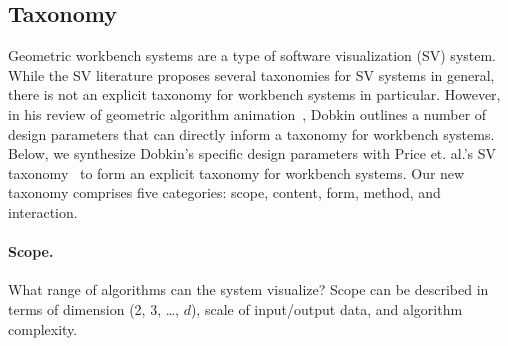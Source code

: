 \subsection{Taxonomy} 



Geometric workbench systems are a type of software visualization (SV) system.
While the SV literature proposes several taxonomies for SV systems in general,
there is not an explicit taxonomy for workbench systems in particular. However,
in his review of geometric algorithm animation~\cite{hausner1999animation},
Dobkin outlines a number of design parameters that can directly inform a
taxonomy for workbench systems. Below, we synthesize Dobkin's specific design
parameters with Price et. al.'s SV taxonomy~\cite{price1993principled} to form
an explicit taxonomy for workbench systems. Our new taxonomy comprises five
categories: scope, content, form, method, and interaction.

\paragraph{Scope.} What range of algorithms can the system visualize? Scope can
be described in terms of dimension (2, 3, \ldots, $d$), scale of input/output
data, and algorithm complexity.


